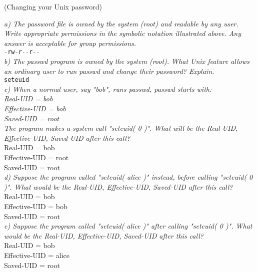 \begin{prob}  (Changing your Unix password) 
\end{prob}

\noindent \textit{a) The password file is owned by the system (root) and readable by any user. Write appropriate permissions in the symbolic notation illustrated above. Any answer is acceptable for group permissions.}\\

 \verb+-rw-r--r--+\\

\noindent \textit{b) The passwd program is owned by the system (root). What Unix feature allows an ordinary user to run passwd and change their password? Explain.}\\

 \verb+seteuid+\\

\noindent \textit{c) When a normal user, say "bob", runs passwd, passwd starts with:\\
      \indent Real-UID = bob \\
      \indent Effective-UID = bob\\ 
      \indent Saved-UID = root \\
The program makes a system call "seteuid( 0 )". What will be the Real-UID, Effective-UID, Saved-UID after this call?}\\

      \indent Real-UID = bob \\
      \indent Effective-UID = root\\ 
      \indent Saved-UID = root \\

\noindent \textit{d) Suppose the program called "seteuid( alice )" instead, before calling "seteuid( 0 )". What would be the Real-UID, Effective-UID, Saved-UID after this call?}\\

      \indent Real-UID = bob \\
      \indent Effective-UID = bob\\ 
      \indent Saved-UID = root \\

\noindent \textit{e) Suppose the program called "seteuid( alice )" after calling "seteuid( 0 )". What would be the Real-UID, Effective-UID, Saved-UID after this call?}\\

      \indent Real-UID = bob \\
      \indent Effective-UID = alice\\ 
      \indent Saved-UID = root \\

